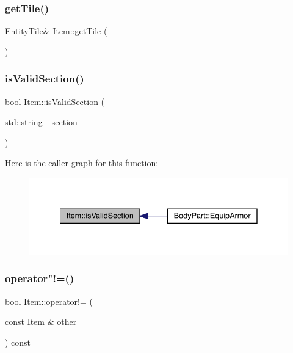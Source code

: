 \mbox{\label{class_item_a61272a187be1a07a49685cbee45d30bd}} 
\subsubsection{\texorpdfstring{get\+Tile()}{getTile()}}
{\footnotesize\ttfamily \mbox{\hyperlink{class_entity_tile}{Entity\+Tile}}\& Item\+::get\+Tile (\begin{DoxyParamCaption}{ }\end{DoxyParamCaption})}

\mbox{\label{class_item_a10dd503844c230e3d3bf890e969af867}} 
\subsubsection{\texorpdfstring{is\+Valid\+Section()}{isValidSection()}}
{\footnotesize\ttfamily bool Item\+::is\+Valid\+Section (\begin{DoxyParamCaption}\item[{std\+::string}]{\+\_\+section }\end{DoxyParamCaption})}

Here is the caller graph for this function\+:
\nopagebreak
\begin{figure}[H]
\begin{center}
\leavevmode
\includegraphics[width=335pt]{class_item_a10dd503844c230e3d3bf890e969af867_icgraph}
\end{center}
\end{figure}
\mbox{\label{class_item_a612c595b62d2f7b9c5cd2b085a14b365}} 
\subsubsection{\texorpdfstring{operator"!=()}{operator!=()}}
{\footnotesize\ttfamily bool Item\+::operator!= (\begin{DoxyParamCaption}\item[{const \mbox{\hyperlink{class_item}{Item}} \&}]{other }\end{DoxyParamCaption}) const}

